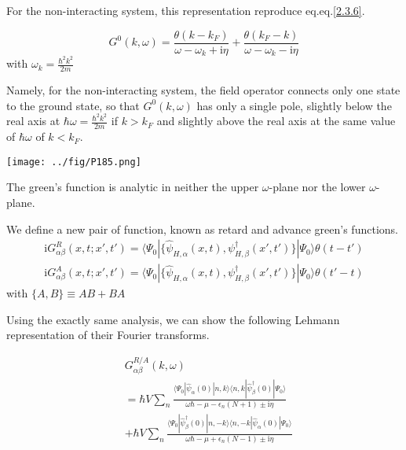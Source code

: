 For the non-interacting system, this representation reproduce eq.eq.\eqref{2.3.6}.

\begin{equation}
G^0(k,\omega)=\frac{\theta(k-k_F)}{\omega-\omega_k+\mathrm{i}\eta}+\frac{\theta(k_F-k)}{\omega-\omega_k-\mathrm{i}\eta} \nonumber
\end{equation} 
with $\omega_k=\frac{\hbar^2k^2}{2m}$

Namely, for the non-interacting system, the field operator connects only one state to the ground state, so that $G^0(k,\omega)$ has only a single pole, slightly below the real axis at $\hbar \omega=\frac{\hbar^2k^2}{2m}$ if $k>k_F$ and slightly above the real axis at the same value of $\hbar \omega$ of $k<k_F$.


\begin{center}
\texttt{[image: ../fig/P185.png]}
\end{center}

The green's function is analytic in neither the upper $\omega$-plane nor the lower $\omega$-plane.

We define a new pair of function, known as retard and advance green's functions.
\begin{align}\label{2.3.13}
\mathrm{i}G^R_{\alpha\beta}(x,t;x',t')=\langle \Psi_0|\{\hat \psi_{H,\alpha}(x,t),\psi^{\dagger}_{H,\beta}(x',t')\}|\Psi_0\rangle\theta(t-t')
\end{align}
\begin{align}\label{2.3.14}
\mathrm{i}G^A_{\alpha\beta}(x,t;x',t')=\langle \Psi_0|\{\hat \psi_{H,\alpha}(x,t),\psi^{\dagger}_{H,\beta}(x',t')\}|\Psi_0\rangle\theta(t'-t)
\end{align}
with $\{A,B\}\equiv AB+BA$

Using the exactly same analysis, we can show the following Lehmann representation of their Fourier transforms.

\begin{align}\label{2.3.15}
& G^{R/A}_{\alpha\beta}(k,\omega) \nonumber \\
&=\hbar V\sum_n \frac{\langle\Psi_0|\hat \psi_{\alpha}(0)|n,k\rangle\langle n,k|\hat \psi^{
\dagger}_{\beta} (0)|\Psi_0\rangle}{\omega\hbar-\mu-\epsilon_n(N+1)\pm\mathrm{i}\eta}  \nonumber \\
&+\hbar V\sum_n \frac{\langle\Psi_0|\hat \psi^{
\dagger}_{\beta} (0)|n,-k\rangle\langle n,-k|\hat \psi_{\alpha}(0)|\Psi_0\rangle}{\omega\hbar-\mu+\epsilon_n(N-1)\pm\mathrm{i}\eta} \nonumber\tag{2.3.15A/B} 
\end{align}


